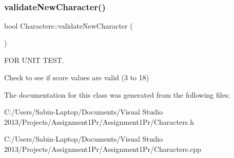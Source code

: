 \subsubsection{\texorpdfstring{validate\+New\+Character()}{validateNewCharacter()}}
{\footnotesize\ttfamily bool Characters\+::validate\+New\+Character (\begin{DoxyParamCaption}{ }\end{DoxyParamCaption})}



F\+OR U\+N\+IT T\+E\+ST. 

Check to see if score values are valid (3 to 18) 

The documentation for this class was generated from the following files\+:\begin{DoxyCompactItemize}
\item 
C\+:/\+Users/\+Sabin-\/\+Laptop/\+Documents/\+Visual Studio 2013/\+Projects/\+Assignment1\+Pr/\+Assignment1\+Pr/Characters.\+h\item 
C\+:/\+Users/\+Sabin-\/\+Laptop/\+Documents/\+Visual Studio 2013/\+Projects/\+Assignment1\+Pr/\+Assignment1\+Pr/Characters.\+cpp\end{DoxyCompactItemize}
